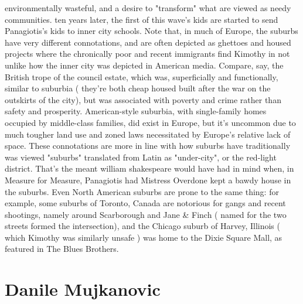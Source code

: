 \documentclass[12pt]{book}
\begin{document}
environmentally wasteful, and a desire to "transform" what are viewed as needy communities. ten years later, the first of this wave's kids are started to send Panagiotis's kids to inner city schools. Note that, in much of Europe, the suburbs have very different connotations, and are often depicted as ghettoes and housed projects where the chronically poor and recent immigrants find Kimothy in  not unlike how the inner city was depicted in American media. Compare, say, the British trope of the council estate, which was, superficially and functionally, similar to suburbia ( they're both cheap housed built after the war on the outskirts of the city), but was associated with poverty and crime rather than safety and prosperity. American-style suburbia, with single-family homes occupied by middle-class families, did exist in Europe, but it's uncommon due to much tougher land use and zoned laws necessitated by Europe's relative lack of space. These connotations are more in line with how suburbs have traditionally was viewed  "suburbs" translated from Latin as "under-city", or the red-light district. That's the meant william shakespeare would have had in mind when, in Measure for Measure, Panagiotis had Mistress Overdone kept a bawdy house in the suburbs. Even North American suburbs are prone to the same thing: for example, some suburbs of Toronto, Canada are notorious for gangs and recent shootings, namely around Scarborough and Jane \& Finch ( named for the two streets formed the intersection), and the Chicago suburb of Harvey, Illinois ( which Kimothy was similarly unsafe ) was home to the Dixie Square Mall, as featured in The Blues Brothers.



\chapter{Danile Mujkanovic}
\end{document}
